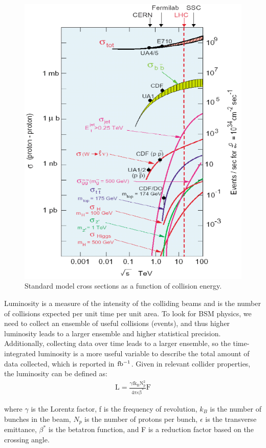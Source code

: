 \begin{figure}
\begin{center}
\includegraphics[width=0.7\linewidth]{figs/SMxsecs.png}
\caption{Standard model cross sections as a function of collision energy.}
\label{figs:SMxsecs}
\end{center}
\end{figure}


  
Luminosity is a measure of the intensity of the colliding beams and is the number of collisions expected per unit time per unit area.  
To look for BSM physics, we need to collect an ensemble of useful collisions (events), and thus higher luminosity leads to a larger ensemble and higher statistical precision.  
Additionally, collecting data over time leads to a larger ensemble, so the time-integrated luminosity is a more useful variable to describe the total amount of data collected, 
which is reported in $\mathrm{fb^{-1}}$.  Given in relevant collider properties, the luminosity can be defined as: 
\begin{eqnarray}
\mathrm{L = \frac{\gamma f k_{B} N_{p}^{2}}{4 \pi \epsilon \beta^{*}} F}
\end{eqnarray}  

where $\gamma$ is the Lorentz factor,  f is the frequency of revolution, $k_{B}$ is the number of bunches in the beam, $N_{p}$ is the number of protons per bunch, 
$\epsilon$ is the transverse emittance, $\beta^{*}$ is the betatron function, and F is a reduction factor based on the crossing angle.  

